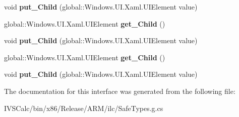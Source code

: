 \begin{DoxyCompactItemize}
void {\bfseries put\+\_\+\+Child} (global\+::\+Windows.\+U\+I.\+Xaml.\+U\+I\+Element value)
\item 
\mbox{\label{interface_windows_1_1_u_i_1_1_xaml_1_1_controls_1_1_i_viewbox_a9f29b16104bada3b3fc1bb5e10080887}} 
global\+::\+Windows.\+U\+I.\+Xaml.\+U\+I\+Element {\bfseries get\+\_\+\+Child} ()
\item 
\mbox{\label{interface_windows_1_1_u_i_1_1_xaml_1_1_controls_1_1_i_viewbox_a21415353a79c331b067409a6923bb18d}} 
void {\bfseries put\+\_\+\+Child} (global\+::\+Windows.\+U\+I.\+Xaml.\+U\+I\+Element value)
\item 
\mbox{\label{interface_windows_1_1_u_i_1_1_xaml_1_1_controls_1_1_i_viewbox_a9f29b16104bada3b3fc1bb5e10080887}} 
global\+::\+Windows.\+U\+I.\+Xaml.\+U\+I\+Element {\bfseries get\+\_\+\+Child} ()
\item 
\mbox{\label{interface_windows_1_1_u_i_1_1_xaml_1_1_controls_1_1_i_viewbox_a21415353a79c331b067409a6923bb18d}} 
void {\bfseries put\+\_\+\+Child} (global\+::\+Windows.\+U\+I.\+Xaml.\+U\+I\+Element value)
\end{DoxyCompactItemize}


The documentation for this interface was generated from the following file\+:\begin{DoxyCompactItemize}
\item 
I\+V\+S\+Calc/bin/x86/\+Release/\+A\+R\+M/ilc/Safe\+Types.\+g.\+cs\end{DoxyCompactItemize}
